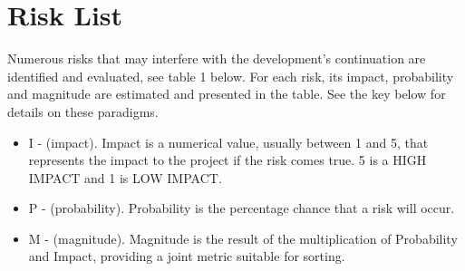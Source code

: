 \documentclass[12pt]{article}
\begin{document}

\section{Risk List}
Numerous risks that may interfere with the development's continuation are identified and evaluated, see table 1 below. For each risk, its impact, probability and magnitude are estimated and presented in the table. See the key below for details on these paradigms. 

\begin{itemize}
\item I - (impact). Impact is a numerical value, usually between 1 and 5, that represents the impact to the project if the risk comes true. 5 is a HIGH IMPACT and 1 is LOW IMPACT.
\item P - (probability). Probability is the percentage chance that a risk will occur.
\item M - (magnitude). Magnitude is the result of the multiplication of Probability and Impact, providing a joint metric suitable for sorting.
\end{itemize}
\par
\end{document}
